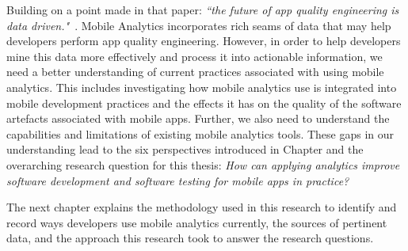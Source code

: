 Building on a point made in that paper: \emph{``the future of app quality engineering is data driven."}~. Mobile Analytics incorporates rich seams of data that may help developers perform app quality engineering. However, in order to help developers mine this data more effectively and process it into actionable information, we need a better understanding of current practices associated with using mobile analytics. This includes investigating how mobile analytics use is integrated into mobile development practices and the effects it has on the quality of the software artefacts associated with mobile apps. Further, we also need to understand the capabilities and limitations of existing mobile analytics tools. These gaps in our understanding lead to the six perspectives introduced in Chapter  and the overarching research question for this thesis: \emph{How can applying analytics improve software development and software testing for mobile apps in practice?}

The next chapter explains the methodology used in this research to identify and record ways developers use mobile analytics currently, the sources of pertinent data, and the approach this research took to answer the research questions.


